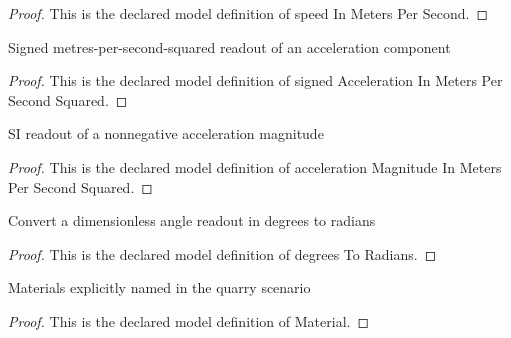 \begin{proof}
  This is the declared model definition of speed In Meters Per Second.
\end{proof}
\begin{definition}
  \label{def:physics:phyx-mini-0800:phyxminiproblems-problemphyxmini0800-signedaccelerationinmeterspersecondsquared}
  Signed metres-per-second-squared readout of an acceleration component
\end{definition}
\begin{proof}
  This is the declared model definition of signed Acceleration In Meters Per Second Squared.
\end{proof}
\begin{definition}
  \label{def:physics:phyx-mini-0800:phyxminiproblems-problemphyxmini0800-accelerationmagnitudeinmeterspersecondsquared}
  SI readout of a nonnegative acceleration magnitude
\end{definition}
\begin{proof}
  This is the declared model definition of acceleration Magnitude In Meters Per Second Squared.
\end{proof}
\begin{definition}
  \label{def:physics:phyx-mini-0800:phyxminiproblems-problemphyxmini0800-degreestoradians}
  Convert a dimensionless angle readout in degrees to radians
\end{definition}
\begin{proof}
  This is the declared model definition of degrees To Radians.
\end{proof}
\begin{definition}[Material]
  \label{def:physics:phyx-mini-0800:phyxminiproblems-problemphyxmini0800-material}
  Materials explicitly named in the quarry scenario
\end{definition}
\begin{proof}
  This is the declared model definition of Material.
\end{proof}
